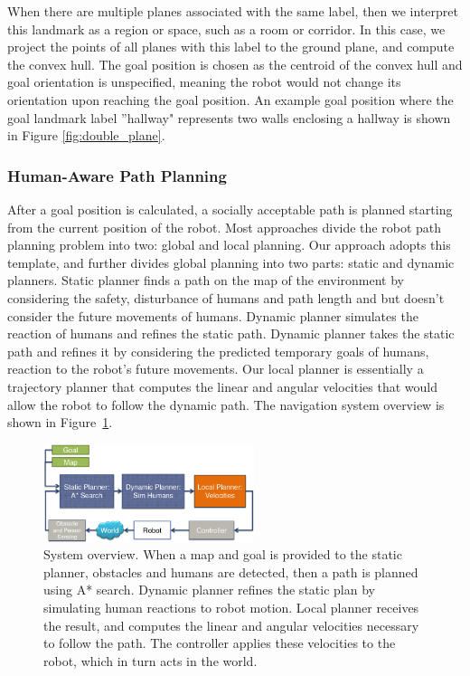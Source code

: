 \documentclass{tADR2e}
\begin{document}
When there are multiple planes associated with the same label, then we interpret this landmark as a region or space, such as a room or corridor. In this case, we project the points of all planes with this label to the ground plane, and compute the convex hull. The goal position is chosen as the centroid of the convex hull and goal orientation is unspecified, meaning the robot would not change its orientation upon reaching the goal position. An example goal position where the goal landmark label ''hallway" represents two walls enclosing a hallway is shown in Figure \ref{fig:double_plane}.

\subsubsection{Human-Aware Path Planning}
\label{sec:human_aware_path_planning}

After a goal position is calculated, a socially acceptable path is planned starting from the current position of the robot. Most approaches divide the robot path planning problem into two: global and local planning. Our approach adopts this template, and further divides global planning into two parts: static and dynamic planners. Static planner finds a path on the map of the environment by considering the safety, disturbance of humans and path length and but doesn't consider the future movements of humans. Dynamic planner simulates the reaction of humans and refines the static path. Dynamic planner takes the static path and refines it by considering the predicted temporary goals of humans, reaction to the robot's future movements. Our local planner is essentially a trajectory planner that computes the linear and angular velocities that would allow the robot to follow the dynamic path. The navigation system overview is shown in Figure~\ref{fig:navigation_overview}.

\begin{figure}[ht!]
\centering
\includegraphics[width=0.55\textwidth]{pics/overview_crop.png}
\caption{System overview. When a map and goal is provided to the static planner, obstacles and humans are detected, then a path is planned using A* search. Dynamic planner refines the static plan by simulating human reactions to robot motion. Local planner receives the result, and computes the linear and angular velocities necessary to follow the path. The controller applies these velocities to the robot, which in turn acts in the world.}
\label{fig:navigation_overview}
\end{figure}
\end{document}
